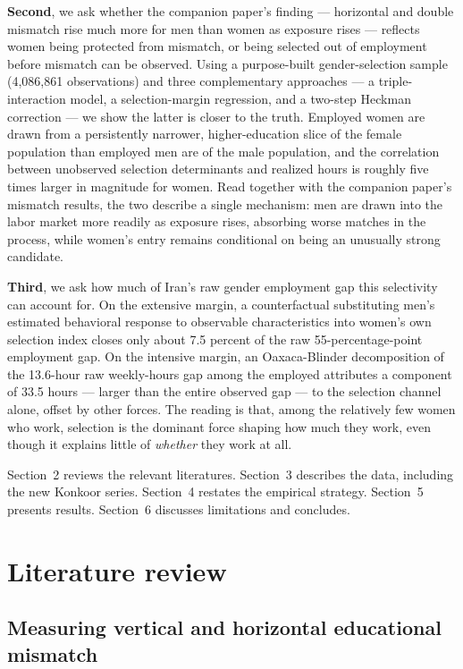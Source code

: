 \documentclass[11pt]{article}
\begin{document}
\textbf{Second}, we ask whether the companion paper's finding --- horizontal and double mismatch rise much more for men than women as exposure rises --- reflects women being protected from mismatch, or being selected out of employment before mismatch can be observed. Using a purpose-built gender-selection sample (4{,}086{,}861 observations) and three complementary approaches --- a triple-interaction model, a selection-margin regression, and a two-step Heckman correction --- we show the latter is closer to the truth. Employed women are drawn from a persistently narrower, higher-education slice of the female population than employed men are of the male population, and the correlation between unobserved selection determinants and realized hours is roughly five times larger in magnitude for women. Read together with the companion paper's mismatch results, the two describe a single mechanism: men are drawn into the labor market more readily as exposure rises, absorbing worse matches in the process, while women's entry remains conditional on being an unusually strong candidate.

\textbf{Third}, we ask how much of Iran's raw gender employment gap this selectivity can account for. On the extensive margin, a counterfactual substituting men's estimated behavioral response to observable characteristics into women's own selection index closes only about 7.5 percent of the raw 55-percentage-point employment gap. On the intensive margin, an Oaxaca-Blinder decomposition of the 13.6-hour raw weekly-hours gap among the employed attributes a component of 33.5 hours --- larger than the entire observed gap --- to the selection channel alone, offset by other forces. The reading is that, among the relatively few women who work, selection is the dominant force shaping how much they work, even though it explains little of \emph{whether} they work at all.

Section~2 reviews the relevant literatures. Section~3 describes the data, including the new Konkoor series. Section~4 restates the empirical strategy. Section~5 presents results. Section~6 discusses limitations and concludes.

\section{Literature review}

\subsection{Measuring vertical and horizontal educational mismatch}
\end{document}
